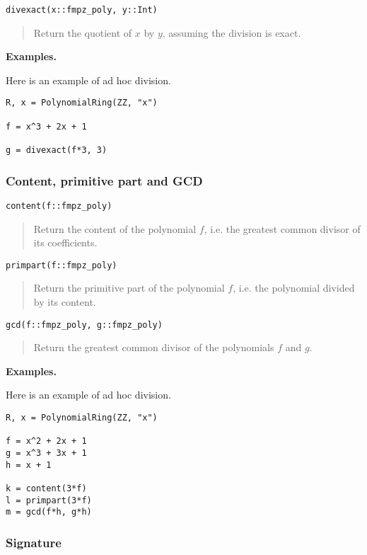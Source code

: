 \documentclass[a4paper,10pt]{article}
\newcommand{\desc}[1]{\vspace{-3mm}\begin{quote}#1\end{quote}}
\begin{document}
{{\begin{lstlisting}
divexact(x::fmpz_poly, y::Int)
\end{lstlisting}

\desc{Return the quotient of $x$ by $y$, assuming the division is exact.}

\textbf{Examples.}

Here is an example of ad hoc division.

\begin{lstlisting}
R, x = PolynomialRing(ZZ, "x")

f = x^3 + 2x + 1

g = divexact(f*3, 3)
\end{lstlisting}

\subsubsection{Content, primitive part and GCD}

\begin{lstlisting}
content(f::fmpz_poly)
\end{lstlisting}

\desc{Return the content of the polynomial $f$, i.e. the greatest common divisor of its
coefficients.}

\begin{lstlisting}
primpart(f::fmpz_poly)
\end{lstlisting}

\desc{Return the primitive part of the polynomial $f$, i.e. the polynomial divided by
its content.}

\begin{lstlisting}
gcd(f::fmpz_poly, g::fmpz_poly)
\end{lstlisting}

\desc{Return the greatest common divisor of the polynomials $f$ and $g$.}

\textbf{Examples.}

Here is an example of ad hoc division.

\begin{lstlisting}
R, x = PolynomialRing(ZZ, "x")

f = x^2 + 2x + 1
g = x^3 + 3x + 1
h = x + 1

k = content(3*f)
l = primpart(3*f)
m = gcd(f*h, g*h)
\end{lstlisting}

\subsubsection{Signature}

}}
\end{document}
